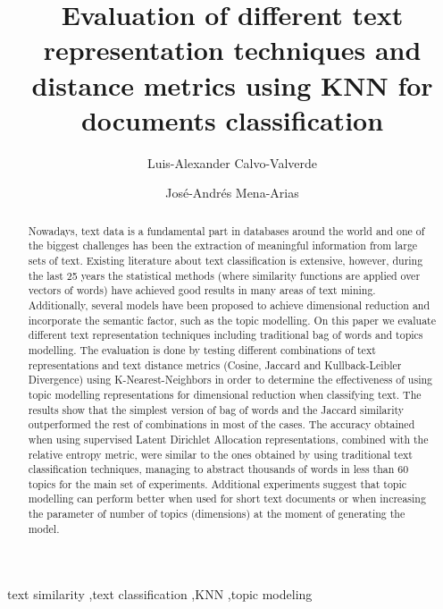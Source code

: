 \documentclass[preprint,12pt,3p]{elsarticle}
\begin{document}
\begin{frontmatter}

\title{Evaluation of different text representation techniques and distance metrics using KNN for documents classification}

\author[label1]{Luis-Alexander Calvo-Valverde}
\address[label1]{DOCINADE, Instituto Tecnol\'{o}gico de Costa Rica, Cartago, Costa Rica}

\author[label2]{Jos\'{e}-Andr\'{e}s Mena-Arias}
\address[label2]{Maestr\'{i}a en Computaci\'{o}n, Instituto Tecnol\'{o}gico de Costa Rica}


\begin{abstract}
Nowadays, text data is a fundamental part in databases around the world and one of the biggest challenges has been the extraction of meaningful information from large sets of text. Existing literature about text classification is extensive, however, during the last 25 years the statistical methods (where similarity functions are applied over vectors of words) have achieved good results in many areas of text mining. Additionally, several models have been proposed to achieve dimensional reduction and incorporate the semantic factor, such as the topic modelling. On this paper we evaluate different text representation techniques including traditional bag of words and topics modelling. The evaluation is done by testing different combinations of text representations and text distance metrics (Cosine, Jaccard and Kullback-Leibler Divergence) using K-Nearest-Neighbors in order to determine the effectiveness of using topic modelling representations for dimensional reduction when classifying text. The results show that the simplest version of bag of words and the Jaccard similarity outperformed the rest of combinations in most of the cases. The accuracy obtained when using supervised Latent Dirichlet Allocation representations, combined with the relative entropy metric, were similar to the ones obtained by using traditional text classification techniques, managing to abstract thousands of words in less than 60 topics for the main set of experiments. Additional experiments suggest that topic modelling can perform better when used for short text documents or when increasing the parameter of number of topics (dimensions) at the moment of generating the model.\par

 
\end{abstract}

\begin{keyword}
text similarity \sep text classification \sep KNN \sep topic modeling
\end{keyword}

\end{frontmatter}
\end{document}
